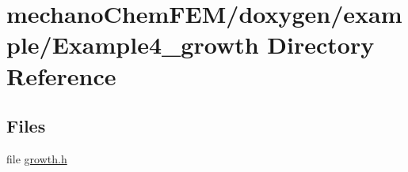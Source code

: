 \section{mechano\+Chem\+F\+E\+M/doxygen/example/\+Example4\+\_\+growth Directory Reference}
\label{dir_df34e1f98057a69a7badbcf9b0acce46}
\subsection*{Files}
\begin{DoxyCompactItemize}
\item 
file \mbox{\hyperlink{growth_8h}{growth.\+h}}
\end{DoxyCompactItemize}
